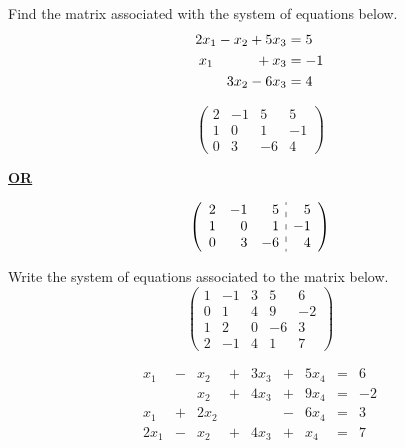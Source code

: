 \documentclass[11pt,letterpaper]{article}
\begin{document}

 Find the matrix associated with the system of equations below. 
	\[
	\begin{aligned}
	2x_1 - x_2 + 5x_3&= 5 \\
	x_1 \hspace{1.05cm} + x_3&= -1 \\
	\phantom{x -} 3x_2 - 6x_3&= 4
	\end{aligned}
	\] \pspace

\sol
	\[
	\begin{pmatrix}
	2 & -1 & 5 & 5 \\
	1 & 0 & 1 & -1 \\
	0 & 3 & -6 & 4
	\end{pmatrix}
	\] \pspace
	
	\begin{center} {\bfseries \underline{OR}} \end{center}

	\[
	\left(
	\begin{array}{rrr:r}
	2 & -1 & 5 & 5 \\
	1 & 0 & 1 & -1 \\
	0 & 3 & -6 & 4
	\end{array} 
	\right)
	\]



\newpage





 Write the system of equations associated to the matrix below. 
	\[
	\begin{pmatrix}
	1 & -1 & 3 & 5 & 6 \\
	0 & 1 & 4 & 9 & -2 \\
	1 & 2 & 0 & -6 & 3 \\
	2 & -1 & 4 & 1 & 7 
	\end{pmatrix}
	\] \pspace

\sol
	\[
	\begin{array}{rcrcrcrcr}
	x_1 & - & x_2 & + & 3x_3 & + & 5x_4 & = & 6 \\
	 &  & x_2 & + & 4x_3 & + & 9x_4 & = & -2 \\
	x_1 & + & 2x_2 &  &  & - & 6x_4 & = & 3 \\
	2x_1 & - & x_2 & + & 4x_3 & + & x_4 & = & 7 
	\end{array}
	\]




\newpage
\end{document}
